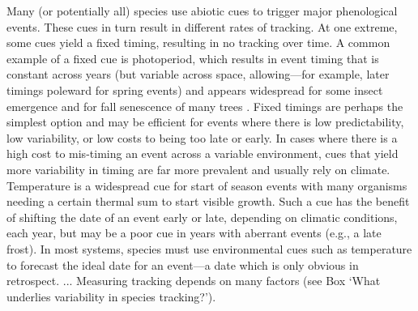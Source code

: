 \documentclass[11pt,letterpaper]{article}
\begin{document}


\newpage


Many (or potentially all) species use abiotic cues to trigger major phenological events. These cues in turn result in different rates of tracking. At one extreme, some cues yield a fixed timing, resulting in no tracking over time. A common example of a fixed cue is photoperiod, which results in event timing that is constant across years (but variable across space, allowing---for example, later timings poleward for spring events) and appears widespread for some insect emergence and for fall senescence of many trees \citep{Denlinger2017,lechowiczbook2002}. Fixed timings are perhaps the simplest option and may be efficient for events where there is low predictability, low variability, or low costs to being too late or early. In cases where there is a high cost to mis-timing an event across a variable environment, cues that yield more variability in timing are far more prevalent and usually rely on climate. Temperature is a widespread cue for start of season events with many organisms needing a certain thermal sum to start visible growth. Such a cue has the benefit of shifting the date of an event early or late, depending on climatic conditions, each year, but may be a poor cue in years with aberrant events (e.g., a late frost). In most systems, species must use environmental cues such as temperature to forecast the ideal date for an event---a date which is only obvious in retrospect. ...  Measuring tracking depends on many factors (see Box `What underlies variability in species tracking?'). 
\end{document}
